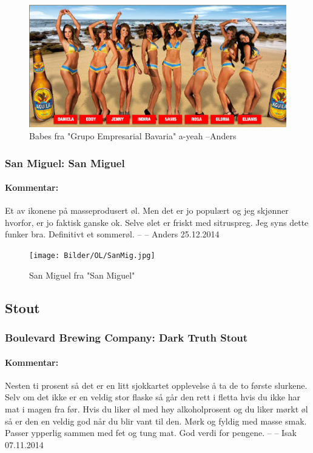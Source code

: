 \documentclass[12pt,a4paper,oneside,norsk]{article}
\begin{document}
\begin{figure} [H]
\centering
\includegraphics[scale=0.31, angle=0]{Bilder/OL/chicas-aguila-2011.jpg}
\caption{Babes fra "Grupo Empresarial Bavaria" a-yeah --Anders}
\end{figure}  

\newpage
\subsubsection{San Miguel: San Miguel}
\paragraph{Kommentar:} Et av ikonene på masseprodusert øl. Men det er jo populært og jeg skjønner hvorfor, er jo faktisk ganske ok. Selve ølet er friskt med sitruspreg. Jeg syns dette funker bra. Definitivt et sommerøl. 
\newline
-- -- Anders 25.12.2014

\begin{figure} [H]
\centering
\texttt{[image: Bilder/OL/SanMig.jpg]}
\caption{San Miguel fra "San Miguel"}
\end{figure}

\newpage
\subsection{Stout}
\subsubsection{Boulevard Brewing Company: Dark Truth Stout}
\paragraph{Kommentar:} Nesten ti prosent så det er en litt sjokkartet opplevelse å ta de to første slurkene. Selv om det ikke er en veldig stor flaske så går den rett i fletta hvis du ikke har mat i magen fra før. Hvis du liker øl med høy alkoholprosent og du liker mørkt øl så er den en veldig god når du blir vant til den. Mørk og fyldig med masse smak. Passer ypperlig sammen med fet og tung mat. God verdi for pengene. 
\newline
-- -- Isak 07.11.2014
\end{document}
